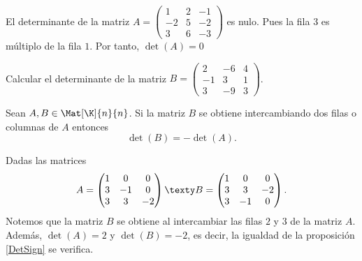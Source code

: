 \documentclass[compacto,10pt]{pubciencias-notas}
\begin{document}
\begin{ejem}
    El determinante de la matriz $A =
\begin{pmatrix}1 & 2 & -1 \\-2 & 5 & -2 \\3 & 6 & -3\end{pmatrix}$ es nulo. Pues la fila $3$ es múltiplo de la fila $1$. Por tanto, $\det(A)=0$
\end{ejem}

\begin{ejer} Calcular el determinante de la matriz $B = 
    \begin{pmatrix}
        2 & -6 & 4 \\
        -1 & 3 & 1 \\
        3 & -9 & 3
    \end{pmatrix}$.
\end{ejer}



\begin{prop}\label{DetSign}
    Sean $A, B \in \Mat[\K]{n}{n}$. Si la matriz $B$ se obtiene intercambiando dos filas o columnas de $A$ entonces
    \[  
        \det(B) = - \det(A).
    \]
\end{prop}

\begin{ejem} Dadas las matrices 
\[
A = 
    \begin{pmatrix}
        1 & 0 & 0 \\
        3 & -1 & 0 \\
        3 & 3 & -2 
    \end{pmatrix}
\texty
B =
    \begin{pmatrix}
        1 & 0 & 0 \\
        3 & 3 & -2 \\
        3 & -1 & 0
    \end{pmatrix}.
\]
Notemos que la matriz $B$ se obtiene al intercambiar las filas $2$ y $3$ de la matriz $A$. Además, $\det(A) = 2$ y $\det(B) = -2$, es decir, la igualdad de la proposición \ref{DetSign} se verifica.
\end{ejem}
\end{document}
